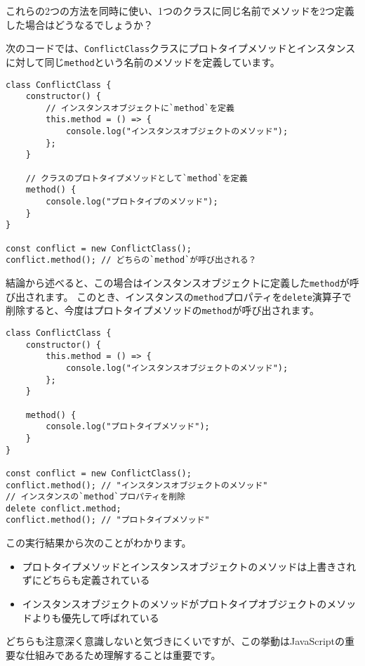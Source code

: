 これらの2つの方法を同時に使い、1つのクラスに同じ名前でメソッドを2つ定義した場合はどうなるでしょうか？

次のコードでは、\texttt{ConflictClass}クラスにプロトタイプメソッドとインスタンスに対して同じ\texttt{method}という名前のメソッドを定義しています。

\begin{lstlisting}
class ConflictClass {
    constructor() {
        // インスタンスオブジェクトに`method`を定義
        this.method = () => {
            console.log("インスタンスオブジェクトのメソッド");
        };
    }

    // クラスのプロトタイプメソッドとして`method`を定義
    method() {
        console.log("プロトタイプのメソッド");
    }
}

const conflict = new ConflictClass();
conflict.method(); // どちらの`method`が呼び出される？
\end{lstlisting}

結論から述べると、この場合はインスタンスオブジェクトに定義した\texttt{method}が呼び出されます。
このとき、インスタンスの\texttt{method}プロパティを\texttt{delete}演算子で削除すると、今度はプロトタイプメソッドの\texttt{method}が呼び出されます。

\begin{lstlisting}
class ConflictClass {
    constructor() {
        this.method = () => {
            console.log("インスタンスオブジェクトのメソッド");
        };
    }

    method() {
        console.log("プロトタイプメソッド");
    }
}

const conflict = new ConflictClass();
conflict.method(); // "インスタンスオブジェクトのメソッド"
// インスタンスの`method`プロパティを削除
delete conflict.method;
conflict.method(); // "プロトタイプメソッド"
\end{lstlisting}

この実行結果から次のことがわかります。

\begin{itemize}
\item
  プロトタイプメソッドとインスタンスオブジェクトのメソッドは上書きされずにどちらも定義されている
\item
  インスタンスオブジェクトのメソッドがプロトタイプオブジェクトのメソッドよりも優先して呼ばれている
\end{itemize}

どちらも注意深く意識しないと気づきにくいですが、この挙動はJavaScriptの重要な仕組みであるため理解することは重要です。


